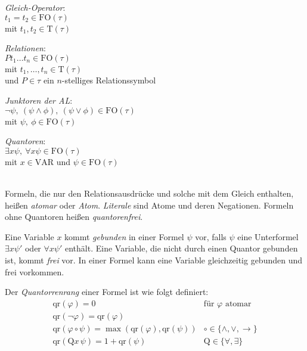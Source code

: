 \documentclass[a4paper,parskip=half*,DIV=15,fontsize=11pt]{scrartcl}
\newcommand{\FO}{\mathrm{FO}}
\newcommand{\VAR}{\mathrm{VAR}}
\newcommand{\T}{\mathrm{T}}
\newcommand{\qr}{\mathrm{qr}}
\begin{document}
\begin{minipage}[t]{0.2\textwidth}
\begin{center}
\emph{Gleich-Operator}: \\
$t_1 = t_2 \in \FO(\tau)$ \\ \footnotesize
mit $t_1, t_2 \in \T(\tau)$
\end{center}
\end{minipage}
\begin{minipage}[t]{0.25\textwidth}
\begin{center}
\emph{Relationen}: \\
$P t_1 \ldots t_n \in \FO(\tau)$ \\ \footnotesize
mit $t_1, \ldots, t_n \in \T(\tau)$ \\
und $P \in \tau$ ein $n$-stelliges Relationssymbol
\end{center}
\end{minipage}
\begin{minipage}[t]{0.3\textwidth}
\begin{center}
\emph{Junktoren der AL}: \\
$\neg \psi,\ (\psi \land \phi),\ (\psi \lor \phi) \in \FO(\tau)$ \\ \footnotesize
mit $\psi,\ \phi \in \FO(\tau)$
\end{center}
\end{minipage}
\begin{minipage}[t]{0.25\textwidth}
\begin{center}
\emph{Quantoren}: \\
$\exists x \psi,\ \forall x \psi \in \FO(\tau)$ \\ \footnotesize
mit $x \in \VAR$ und $\psi \in \FO(\tau)$
\end{center}
\end{minipage}
\ \\

Formeln, die nur den Relationsausdrücke und solche mit dem Gleich enthalten, heißen \emph{atomar} oder \emph{Atom}. \emph{Literale} sind Atome und deren Negationen. Formeln ohne Quantoren heißen \emph{quantorenfrei}.

Eine Variable $x$ kommt \emph{gebunden} in einer Formel $\psi$ vor, falls $\psi$ eine Unterformel $\exists x \psi'$ oder $\forall x \psi'$ enthält. Eine Variable, die nicht durch einen Quantor gebunden ist, kommt \emph{frei} vor. In einer Formel kann eine Variable gleichzeitig gebunden und frei vorkommen.

Der \emph{Quantorrenrang} einer Formel ist wie folgt definiert:
\[\begin{array}{cc}
\qr(\varphi) = 0 & \text{für $\varphi$ atomar}  \\
\qr(\neg \varphi) = \qr(\varphi)    \\
\qr(\varphi \circ \psi) = \max(\qr(\varphi), \qr(\psi)) &   \circ \in \{\land, \lor, \to\}  \\
\qr(\mathrm{Q}x\,\psi) = 1 + \qr(\psi) & \mathrm{Q} \in \{\forall, \exists\}
\end{array}\]
\end{document}
